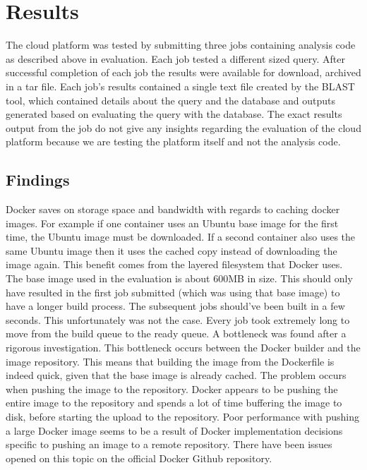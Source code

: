 \documentclass{sig-alternate-05-2015}
\begin{document}
\section{Results}
The cloud platform was tested by submitting three jobs containing analysis code as described above in evaluation. Each job tested a different sized query. After successful completion of each job the results were available for download, archived in a tar file. Each job's results contained a single text file created by the BLAST tool, which contained details about the query and the database and outputs generated based on evaluating the query with the database. The exact results output from the job do not give any insights regarding the evaluation of the cloud platform because we are testing the platform itself and not the analysis code. 

\subsection{Findings}
Docker saves on storage space and bandwidth with regards to caching docker images. For example if one container uses an Ubuntu base image for the first time, the Ubuntu image must be downloaded. If a second container also uses the same Ubuntu image then it uses the cached copy instead of downloading the image again. This benefit comes from the layered filesystem that Docker uses. 
The base image used in the evaluation is about 600MB in size. This should only have resulted in the first job submitted (which was using that base image) to have a longer build process. The subsequent jobs should've been built in a few seconds. This unfortunately was not the case. Every job took extremely long to move from the build queue to the ready queue. A bottleneck was found after a rigorous investigation. This bottleneck occurs between the Docker builder and the image repository. This means that building the image from the Dockerfile is indeed quick, given that the base image is already cached. The problem occurs when pushing the image to the repository. Docker appears to be pushing the entire image to the repository and spends a lot of time buffering the image to disk, before starting the upload to the repository. Poor performance with pushing a large Docker image seems to be a result of Docker implementation decisions specific to pushing an image to a remote repository. There have been issues opened on this topic on the official Docker Github repository.
\\\\
\end{document}
